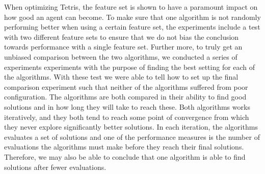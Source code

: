 When optimizing Tetris, the feature set is shown to have a paramount impact on
how good an agent can become. To make sure that one algorithm is not randomly performing
better when using a certain feature set, the experiments include a test with two different 
feature sets to ensure that we do not bias the conclusion towards performance with a 
single feature set. Further more, to truly get an unbiased comparison between the two 
algorithms, we conducted a series of experiments experiments with the purpose of finding
the best setting for each of the algorithms. With these test we were able to 
tell how to set up the final comparison experiment such that neither of the
algorithms suffered from poor configuration. The algorithms are both 
compared in their ability to find good solutions and in how long they will 
take to reach these. Both algorithms works iteratively, and they both tend to
reach some point of convergence from which they never explore significantly better 
solutions. In each iteration, the algorithms evaluates a set of solutions and one of the
performance measures is the number of evaluations the algorithms must make 
before they reach their final solutions. Therefore, we may also be able to conclude 
that one algorithm is able to find solutions after fewer evaluations.




